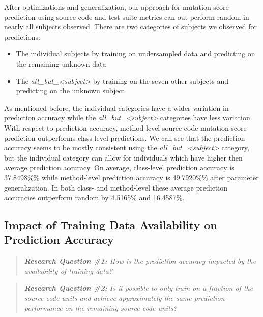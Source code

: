 After optimizations and generalization, our approach for mutation score prediction using source code and test suite metrics can out perform random in nearly all subjects observed. There are two categories of subjects we observed for predictions:

\begin{itemize}
  \item The individual subjects by training on undersampled data and predicting on the remaining unknown data
  \item The \emph{all\_but\_<subject>} by training on the seven other subjects and predicting on the unknown subject
\end{itemize}

As mentioned before, the individual categories have a wider variation in prediction accuracy while the \emph{all\_but\_<subject>} categories have less variation. With respect to prediction accuracy, method-level source code mutation score prediction outperforms class-level predictions. We can see that the prediction accuracy seems to be mostly consistent using the \emph{all\_but\_<subject>} category, but the individual category can allow for individuals which have higher then average prediction accuracy. On average, class-level prediction accuracy is 37.8498\%\% while method-level prediction accuracy is 49.7920\%\% after parameter generalization. In both class- and method-level these average prediction accuracies outperform random by 4.5165\% and 16.4587\%.


\subsection{Impact of Training Data Availability on Prediction Accuracy}
\label{subsec:experiment_data}
\begin{quote}
	\emph{\textbf{Research Question \#1:} How is the prediction accuracy impacted by the availability of training data?}
\end{quote}

\begin{quote}
  \emph{\textbf{Research Question \#2:} Is it possible to only train on a fraction of the source code units and achieve approximately the same prediction performance on the remaining source code units?}
\end{quote}

